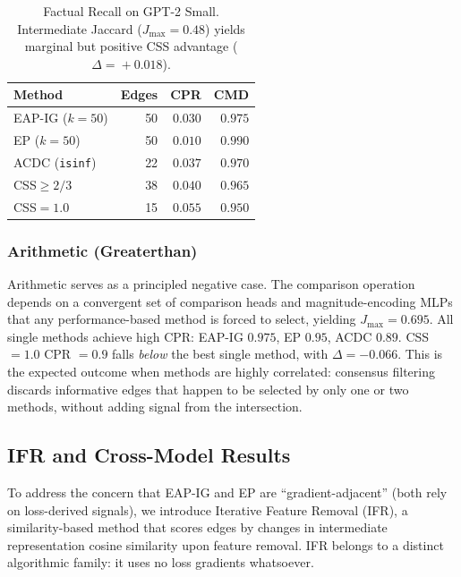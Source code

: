 \documentclass[11pt,a4paper]{article}
\newcommand{\css}{\textsc{CSS}}
\begin{document}
\begin{table}[t]
\centering
\small
\begin{tabular}{lrrr}
\toprule
\textbf{Method} & \textbf{Edges} & \textbf{CPR} & \textbf{CMD} \\
\midrule
EAP-IG ($k\!=\!50$) & 50 & $0.030$ & $0.975$ \\
EP ($k\!=\!50$) & 50 & $0.010$ & $0.990$ \\
ACDC (\texttt{isinf}) & 22 & $0.037$ & $0.970$ \\
\midrule
\css{}$\ge 2/3$ & 38 & $0.040$ & $0.965$ \\
\css{}$= 1.0$ & 15 & $\mathbf{0.055}$ & $0.950$ \\
\bottomrule
\end{tabular}
\caption{Factual Recall on GPT-2 Small. Intermediate Jaccard ($J_{\max}\!=\!0.48$) yields marginal but positive CSS advantage ($\Delta\!=\!+0.018$).}
\label{tab:factual_summary}
\end{table}

\subsubsection{Arithmetic (Greaterthan)}

Arithmetic serves as a principled negative case.
The comparison operation depends on a convergent set of comparison heads and magnitude-encoding MLPs that any performance-based method is forced to select, yielding $J_{\max}\!=\!0.695$.
All single methods achieve high CPR: EAP-IG $0.975$, EP $0.95$, ACDC $0.89$.
\css{}$=1.0$ CPR $= 0.9$ falls \emph{below} the best single method, with $\Delta = -0.066$.
This is the expected outcome when methods are highly correlated: consensus filtering discards informative edges that happen to be selected by only one or two methods, without adding signal from the intersection.

\subsection{IFR and Cross-Model Results}
\label{sec:ifr}

To address the concern that EAP-IG and EP are ``gradient-adjacent'' (both rely on loss-derived signals), we introduce Iterative Feature Removal (IFR), a similarity-based method that scores edges by changes in intermediate representation cosine similarity upon feature removal.
IFR belongs to a distinct algorithmic family: it uses no loss gradients whatsoever.
\end{document}
